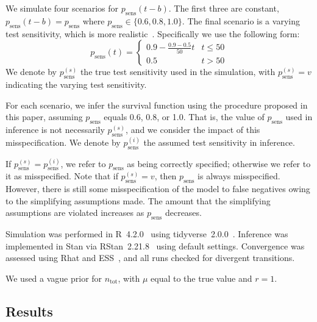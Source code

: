 \documentclass[12pt]{article}
\newcommand{\psens}{p_\text{sens}}
\newcommand{\psenss}{p_\text{sens}^{(s)}}
\newcommand{\psensi}{p_\text{sens}^{(i)}}
\newcommand{\ntot}{n_\text{tot}}
\begin{document}
We simulate four scenarios for $\psens(t - b)$.
The first three are constant, $\psens(t-b) = \psens$ where $\psens \in \{ 0.6, 0.8, 1.0 \}$.
The final scenario is a varying test sensitivity, which is more realistic~\citep{blakeThesis}.
Specifically we use the following form:
\begin{equation}
  p_\text{sens}(t) = \begin{cases}
    0.9 - \frac{0.9-0.5}{50}t &t \leq 50 \\
    0.5 &t > 50
  \end{cases}
  \label{imperf-test:eq:variable-test-sensitivity}
\end{equation}
We denote by $\psenss$ the true test sensitivity used in the simulation, with $\psenss = v$ indicating the varying test sensitivity.

For each scenario, we infer the survival function using the procedure proposed in this paper, assuming $\psens$ equals 0.6, 0.8, or 1.0.
That is, the value of $\psens$ used in inference is not necessarily $\psenss$, and we consider the impact of this misspecification.
We denote by $\psensi$ the assumed test sensitivity in inference.

If $\psenss = \psensi$, we refer to $\psens$ as being correctly specified; otherwise we refer to it as misspecified.
Note that if $\psenss = v$, then $\psens$ is always misspecified.
However, there is still some misspecification of the model to false negatives owing to the simplifying assumptions made.
The amount that the simplifying assumptions are violated increases as $\psens$ decreases.

Simulation was performed in R~4.2.0~\citep{R-4-2-0} using tidyverse~2.0.0~\citep{tidyverse}.
Inference was implemented in Stan via RStan~2.21.8~\citep{rstan2-21-8} using default settings.
Convergence was assessed using Rhat and ESS~\cite{vehtariRhat}, and all runs checked for divergent transitions.

We used a vague prior for $\ntot$, with $\mu$ equal to the true value and $r=1$.

\subsection{Results}
\end{document}
